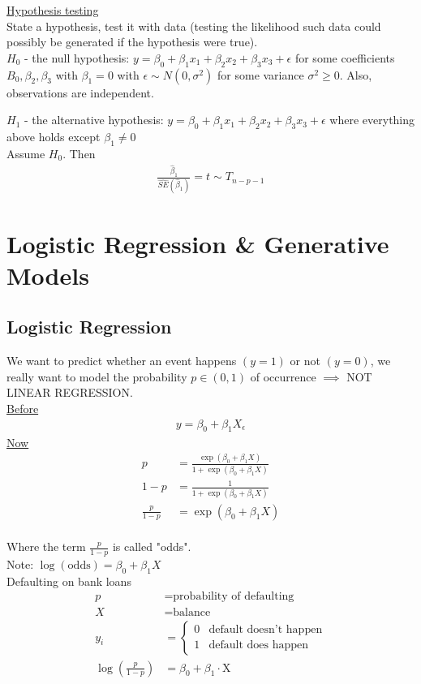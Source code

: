 \documentclass[12pt, letterpaper]{article}
\begin{document}
\noindent \underline{Hypothesis testing} \\

\noindent State a hypothesis, test it with data (testing the likelihood such data could possibly be generated if the hypothesis were true). \\

$H_0$ - the null hypothesis: $y = \beta_0 + \beta_1x_1 + \beta_2x_2 + \beta_3x_3 + \epsilon$ for some coefficients $B_0, \beta_2, \beta_3$ with $\beta_1 = 0$ 
with $\epsilon \sim N(0,\sigma^2)$ for some variance $\sigma^2 \ge 0$. Also, observations are independent.

$H_1$ - the alternative hypothesis: $y = \beta_0 + \beta_1x_1 + \beta_2x_2 + \beta_3x_3+\epsilon$ where everything above holds except $\beta_1 \ne 0$ \\ 

Assume $H_0$. Then \begin{align*}
    \frac{\hat \beta_1}{\hat{SE}(\hat \beta_1)} = t \sim T_{n-p-1}
\end{align*}

\section{Logistic Regression \& Generative Models}
\subsection{Logistic Regression}
We want to predict whether an event happens $(y=1)$ or not $(y=0)$, we 
really want to model the probability $p\in(0,1)$ of occurrence $\implies$
NOT LINEAR REGRESSION.\\
\underline{Before}
\begin{align*}
    y= \beta_0 + \beta_1X_ \epsilon
\end{align*}
\underline{Now}
\begin{align*}
    p &= \frac{\exp(\beta_0 + \beta_1X)}{1+\exp(\beta_0+\beta_1X)} \\
    1-p &= \frac{1}{1+\exp(\beta_0+\beta_1X)}\\
    \frac{p}{1-p} &= \exp(\beta_0+\beta_1X)
\end{align*} \\
Where the term $\frac{p}{1-p}$ is called "odds". \\
Note: $\log(\text{odds}) = \beta_0+\beta_1X$ \\

\noindent {} Defaulting on bank loans
\begin{align*}
    p &= \text{probability of defaulting} \\
    X &= \text{balance} \\ 
    y_i &= \begin{cases}
        0 & \text{default doesn't happen} \\
        1 & \text{default does happen}
    \end{cases} \\
    \log(\frac{p}{1-p}) &= \beta_0 + \beta_1 \cdot \text{X} 
\end{align*}
\end{document}
